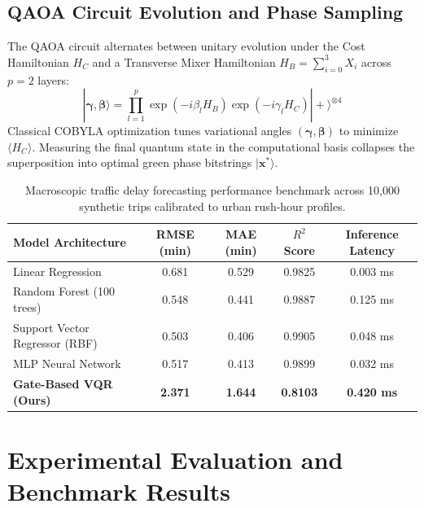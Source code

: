 \documentclass{llncs}
\begin{document}
\subsection{QAOA Circuit Evolution and Phase Sampling}
The QAOA circuit alternates between unitary evolution under the Cost Hamiltonian $H_C$ and a Transverse Mixer Hamiltonian $H_B = \sum_{i=0}^{3} X_i$ across $p = 2$ layers:
\begin{equation}
|\bm{\gamma}, \bm{\beta}\rangle = \prod_{l=1}^{p} \exp(-i \beta_l H_B) \exp(-i \gamma_l H_C) |+\rangle^{\otimes 4}
\end{equation}
Classical COBYLA optimization tunes variational angles $(\bm{\gamma}, \bm{\beta})$ to minimize $\langle H_C \rangle$. Measuring the final quantum state in the computational basis collapses the superposition into optimal green phase bitstrings $|\mathbf{x}^*\rangle$.

\begin{table}[!t]
\caption{Macroscopic traffic delay forecasting performance benchmark across 10,000 synthetic trips calibrated to urban rush-hour profiles.}
\label{tab:models}
\centering
\small
\begin{tabular}{lcccc}
\toprule
\textbf{Model Architecture} & \textbf{RMSE (min)} & \textbf{MAE (min)} & \textbf{$R^2$ Score} & \textbf{Inference Latency} \\
\midrule
Linear Regression & 0.681 & 0.529 & 0.9825 & 0.003 ms \\
Random Forest (100 trees) & 0.548 & 0.441 & 0.9887 & 0.125 ms \\
Support Vector Regressor (RBF) & 0.503 & 0.406 & 0.9905 & 0.048 ms \\
MLP Neural Network & 0.517 & 0.413 & 0.9899 & 0.032 ms \\
\textbf{Gate-Based VQR (Ours)} & \textbf{2.371} & \textbf{1.644} & \textbf{0.8103} & \textbf{0.420 ms} \\
\bottomrule
\end{tabular}
\end{table}

\section{Experimental Evaluation and Benchmark Results}
\end{document}
